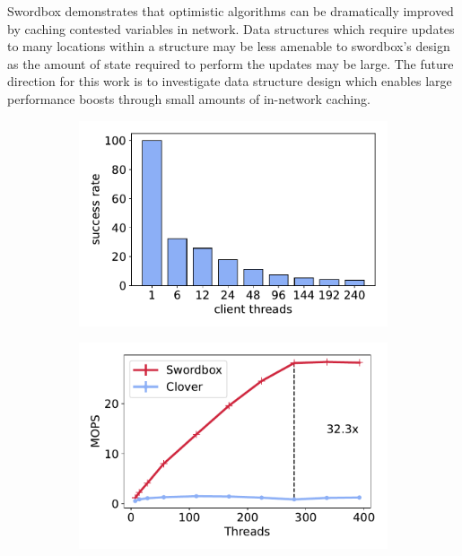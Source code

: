 Swordbox demonstrates that optimistic algorithms can be
dramatically improved by caching contested variables in
network. Data structures which require updates to many
locations within a structure may be less amenable to
swordbox's design as the amount of state required to perform
the updates may be large. The future direction for this work
is to investigate data structure design which enables large
performance boosts through small amounts of in-network
caching.

\begin{figure}[t!]
    \begin{subfigure}{.33\textwidth}
      \centering
      \includegraphics[width=.9\linewidth]{fig/success_rate.pdf}
    \end{subfigure}%
    \begin{subfigure}{.33\textwidth}
      \centering
      \includegraphics[width=.9\linewidth]{fig/full_system_performance.pdf}
    \end{subfigure}
    \begin{subfigure}{.33\textwidth}

\end{subfigure}
\end{figure}
